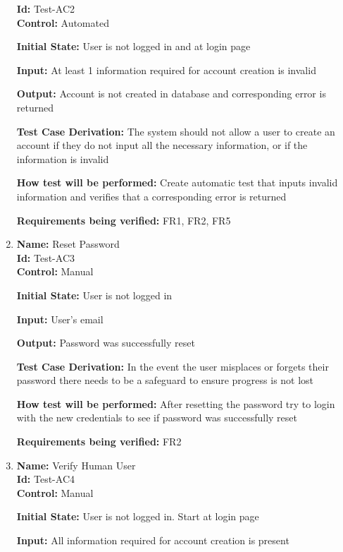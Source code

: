 \documentclass[12pt, titlepage]{article}
\begin{document}
\begin{enumerate}
\textbf{Id:} Test-AC2  \label{Test-AC2}\\

\textbf{Control: }Automated
					
\textbf{Initial State:} User is not logged in and at login page
					
\textbf{Input:} At least 1 information required for account creation is invalid
					
\textbf{Output:} Account is not created in database and corresponding error is returned

\textbf{Test Case Derivation:} The system should not allow a user to create an account if they do not input all the necessary information, or if the information is invalid

\textbf{How test will be performed:} Create automatic test that inputs invalid information and verifies that a corresponding error is returned

\textbf{Requirements being verified:} FR1, FR2, FR5

\item{\textbf{Name:} Reset Password\\} \label{Test-AC3} %
\textbf{Id:} Test-AC3 \label{Test-AC3}\\

\textbf{Control:} Manual

\textbf{Initial State:} User is not logged in

\textbf{Input:} User's email

\textbf{Output:} Password was successfully reset

\textbf{Test Case Derivation:} In the event the user misplaces or forgets their password there needs to be a safeguard to ensure progress is not lost

\textbf{How test will be performed:} After resetting the password try to login with the new credentials to see if password was successfully reset

\textbf{Requirements being verified:} FR2

\item{\textbf{Name:} Verify Human User\\} %
\textbf{Id:} Test-AC4 \label{Test-AC4}\\

\textbf{Control: }Manual
					
\textbf{Initial State:} User is not logged in. Start at login page
					
\textbf{Input: }All information required for account creation is present
					

\end{enumerate}
\end{document}
